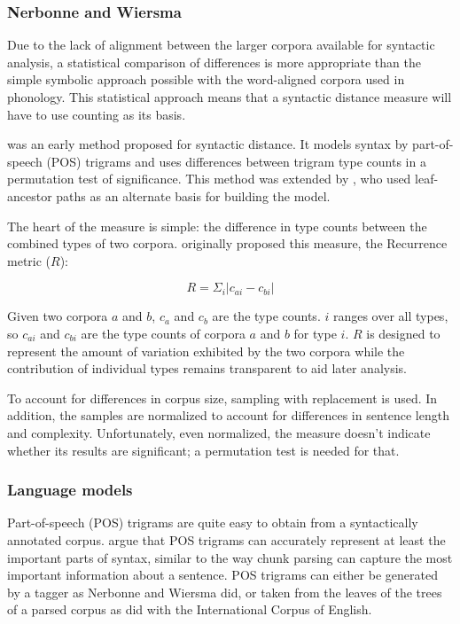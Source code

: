 \documentclass[11pt]{article}
\begin{document}
\subsubsection{Nerbonne and Wiersma}
\label{nerbonne06}

Due to the lack of alignment between the
larger corpora available for syntactic analysis, a statistical
comparison of differences is more appropriate than the simple
symbolic approach possible with the word-aligned corpora used in
phonology. This statistical approach means that a syntactic distance
measure will have to use counting as its basis.

 was an early method proposed for syntactic
distance.  It models syntax by part-of-speech (POS) trigrams and uses
differences between trigram type counts in a permutation test of
significance. This method was extended by , who
used  leaf-ancestor paths as an alternate basis
for building the model.

The heart of the measure is simple: the difference in type counts
between the combined types of two corpora. 
originally proposed this measure, the {\sc Recurrence}
metric ($R$):

\begin{equation}
R = \Sigma_i |c_{ai} - c_{bi}|
\label{rmeasure}
\end{equation}

\noindent{}Given two corpora $a$ and $b$, $c_a$ and $c_b$ are the type
counts. $i$ ranges over all types, so $c_{ai}$ and $c_{bi}$ are the
type counts of corpora $a$ and $b$ for type $i$.  $R$ is designed to
represent the amount of variation exhibited by the two corpora while
the contribution of individual types remains transparent to aid later
analysis.

To account for differences in corpus size, sampling with replacement is
used. In addition, the samples are normalized to account for
differences in sentence length and complexity.  Unfortunately, even normalized, the
measure doesn't indicate whether its results are significant; a
permutation test is needed for that.


\subsubsection{Language models}
Part-of-speech (POS) trigrams are quite easy to obtain from a syntactically
annotated corpus.  argue that POS trigrams
can accurately represent at least the important parts of syntax,
similar to the way chunk parsing can capture the most important
information about a sentence. POS trigrams can either be generated by
a tagger as Nerbonne and Wiersma did, or taken from the leaves of
the trees of a parsed corpus as  did with the
International Corpus of English.
\end{document}
